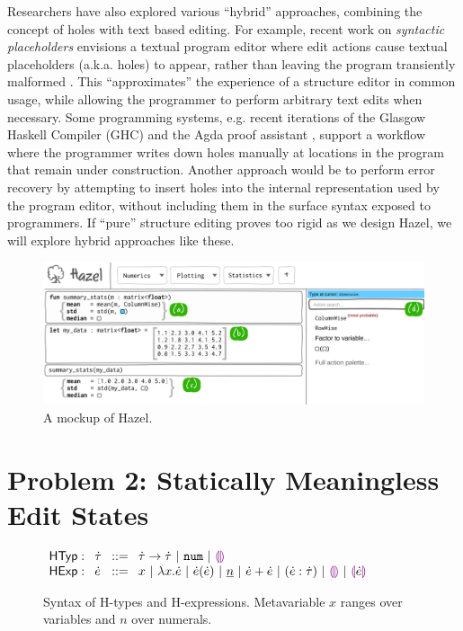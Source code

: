 \documentclass[letterpaper,USenglish]{lipics-v2016}
\newcommand{\Hazel}[0]{\textsf{Hazel}}
\newcommand{\HazelEnv}[0]{\Hazel}
\begin{document}
Researchers have also explored various ``hybrid'' approaches, combining  the concept of holes with text based editing.  For example, recent work on \emph{syntactic placeholders} envisions 
a textual program editor where edit actions cause textual placeholders (a.k.a. holes) to appear, rather than leaving the program transiently malformed \cite{Amorim:2016:PSC:2997364.2997374}. This 
``approximates'' the experience of a structure editor in common usage, while allowing the programmer to perform arbitrary 
text edits when necessary. Some programming systems, e.g. recent iterations of the Glasgow Haskell Compiler (GHC) \cite{haskell-holes} and the Agda proof assistant \cite{norell2009dependently}, support a workflow where the programmer writes down holes manually at locations in the program that remain under construction. Another approach would be to perform error recovery by attempting to insert holes into the internal representation used 
by the program editor, without including them in the surface syntax exposed to programmers. If ``pure'' structure editing proves too rigid as we design \Hazel, we will explore hybrid approaches like these.

\begin{figure}
\includegraphics[width=1.025\textwidth]{mockup-1}
\vspace{-5px}
\caption{A mockup of \HazelEnv.}
\vspace{-5px}
\label{fig:hazel-mockup}
\end{figure}

\section{Problem 2: Statically Meaningless Edit States} 

\begin{figure}[t]
$\arraycolsep=4pt\begin{array}{lllllll}
\mathsf{HTyp:} & \htau & ::= &
  \tarr{\htau}{\htau} ~\vert~
  \tnum ~\vert~
  \tehole
\\
\mathsf{HExp:} & \hexp & ::= &
  x ~\vert~
  \hlam{x}{\hexp} ~\vert~
  \hap{\hexp}{\hexp} ~\vert~
  \hnum{n} ~\vert~
  \hadd{\hexp}{\hexp} ~\vert~
  (\hexp : \htau) ~\vert~
  \hehole ~\vert~
  \hhole{\hexp}
\end{array}$
\caption{Syntax of H-types and H-expressions. Metavariable $x$ ranges over variables and $n$ over numerals.}
\label{fig:hexp-syntax}
\end{figure}
\end{document}
